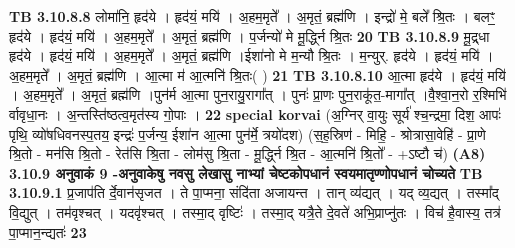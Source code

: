 \documentclass[17pt]{extarticle}
\begin{document}
{{{{{{{{{{{{{{{{{{{{{{                  \newline
                                \textbf{ TB 3.10.8.8} \newline
                  लोमा॑नि॒ हृद॑ये । हृद॑यं॒ मयि॑ । अ॒हम॒मृते᳚ । अ॒मृतं॒ ब्रह्म॑णि । इन्द्रो॑ मे॒ बले᳚ श्रि॒तः । बलꣳ॒॒ हृद॑ये । हृद॑यं॒ मयि॑ । अ॒हम॒मृते᳚ । अ॒मृतं॒ ब्रह्म॑णि । प॒र्जन्यो॑ मे मू॒र्द्ध्नि श्रि॒तः \textbf{ 20} \newline
                  \newline
                                \textbf{ TB 3.10.8.9} \newline
                  मू॒द्र्धा हृद॑ये । हृद॑यं॒ मयि॑ । अ॒हम॒मृते᳚ । अ॒मृतं॒ ब्रह्म॑णि ।ईशा॑नो मे म॒न्यौ श्रि॒तः । म॒न्युर्. हृद॑ये । हृद॑यं॒ मयि॑ । अ॒हम॒मृते᳚ । अ॒मृतं॒ ब्रह्म॑णि । आ॒त्मा म॑ आ॒त्मनि॑ श्रि॒तः( ) \textbf{ 21} \newline
                  \newline
                                \textbf{ TB 3.10.8.10} \newline
                  आ॒त्मा हृद॑ये । हृद॑यं॒ मयि॑ । अ॒हम॒मृते᳚ । अ॒मृतं॒ ब्रह्म॑णि ।पुन॑र्म आ॒त्मा पुन॒रायु॒रागा᳚त् । पुनः॑ प्रा॒णः पुन॒राकू॑त॒-मागा᳚त् ।वै॒श्वा॒न॒रो र॒श्मिभि॑ र्वावृधा॒नः । अ॒न्तस्ति॑ष्ठत्व॒मृत॑स्य गो॒पाः । \textbf{ 22} \newline
                  \newline
                                                        \textbf{special korvai} \newline
              (अ॒ग्निर् वा॒युः सूर्य॑ श्च॒न्द्रमा॒ दिश॒ आपः॑ पृथि॒ व्यो॑षधिवनस्प॒तय॒ इन्द्रः॑ प॒र्जन्य॒ ईशा॑न आ॒त्मा पुन॑र्मे॒ त्रयो॑दश) \newline
                                (स॒ह॒स्रिण॑ - मिहि॒ - श्रोत्रासा॒वेहि॑ - प्रा॒णे श्रि॒तो - मन॑सि श्रि॒तो - रेत॑सि श्रि॒ता - लोम॑सु श्रि॒ता - मू॒र्द्ध्नि श्रि॒त - आ॒त्मनि॑ श्रि॒तो᳚ - +ऽष्टौ च॑) \textbf{(A8)} \newline \newline
                \textbf{ 3.10.9    अनुवाकं   9 -अनुवाकेषु नवसु लेखासु नाभ्यां चेष्टकोपधानं स्वयमातृण्णोपधानं चोच्यते} \newline
                                \textbf{ TB 3.10.9.1} \newline
                  प्र॒जाप॑ति र्दे॒वान॑सृजत । ते पा॒प्मना॒ संदि॑ता अजायन्त । तान् व्य॑द्यत् । यद् व्य॒द्यत् । तस्मा᳚द् वि॒द्युत् । तम॑वृश्चत् । यदवृ॑श्चत् । तस्मा॒द् वृष्टिः॑ । तस्मा॒द् यत्रै॒ते दे॒वते॑ अभि॒प्राप्नु॑तः । विच॑ है॒वास्य॒ तत्र॑ पा॒प्मान॒न्द्यतः॑ \textbf{ 23} \newline
}}}}}}}}}}}}}}}}}}}}}}
\end{document}
